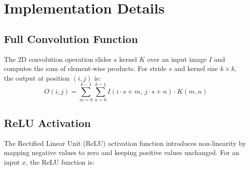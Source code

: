\documentclass[conference]{IEEEtran}
\begin{document}
\section{Implementation Details}

\subsection{Full Convolution Function}

The 2D convolution operation slides a kernel $K$ over an input image $I$ and computes the sum of element-wise products. For stride $s$ and kernel size $k \times k$, the output at position $(i, j)$ is:
\[
O(i, j) = \sum_{m=0}^{k-1} \sum_{n=0}^{k-1} I(i \cdot s + m,\, j \cdot s + n) \cdot K(m, n)
\]

\subsection{ReLU Activation}
The Rectified Linear Unit (ReLU) activation function introduces non-linearity by mapping negative values to zero and keeping positive values unchanged. For an input $x$, the ReLU function is:
\end{document}
